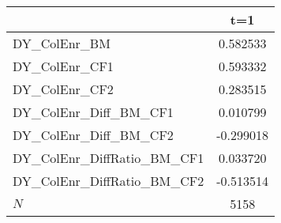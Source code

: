 {
\def\sym#1{\ifmmode^{#1}\else\(^{#1}\)\fi}
\begin{tabular}{l*{1}{c}}
\hline\hline
            &\multicolumn{1}{c}{t=1}\\
\hline
DY\_ColEnr\_BM&    0.582533\\
DY\_ColEnr\_CF1&    0.593332\\
DY\_ColEnr\_CF2&    0.283515\\
DY\_ColEnr\_Diff\_BM\_CF1&    0.010799\\
DY\_ColEnr\_Diff\_BM\_CF2&   -0.299018\\
DY\_ColEnr\_DiffRatio\_BM\_CF1&    0.033720\\
DY\_ColEnr\_DiffRatio\_BM\_CF2&   -0.513514\\
\hline
\(N\)       &        5158\\
\hline\hline
\end{tabular}
}
